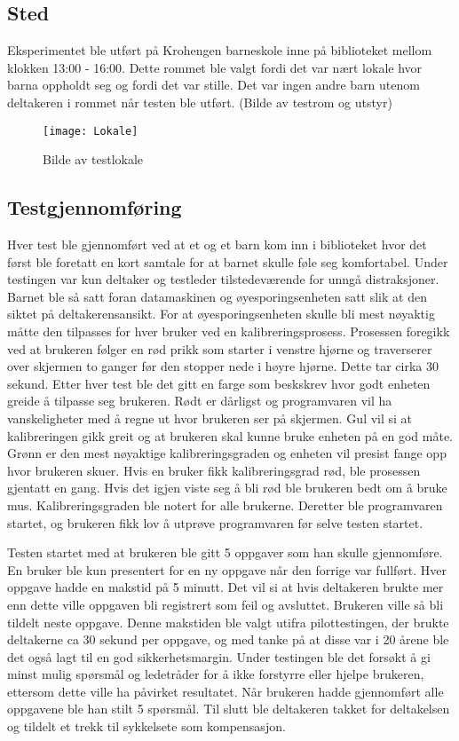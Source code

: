 \subsection{Sted}
Eksperimentet ble utført på Krohengen barneskole inne på biblioteket mellom klokken 13:00 -
16:00. Dette rommet ble valgt fordi det var nært lokale hvor barna oppholdt seg og fordi det var
stille. Det var ingen andre barn utenom deltakeren i rommet når testen ble utført.
(Bilde av testrom og utstyr) 

\begin{figure}[ht!]
\centering
\texttt{[image: Lokale]}
\caption{Bilde av testlokale}
\label{fig:test_lokale}
\end{figure}


\subsection{Testgjennomføring}
Hver test ble gjennomført ved at et og et barn kom inn i biblioteket hvor det først ble foretatt en kort
samtale for at barnet skulle føle seg komfortabel. Under testingen var kun deltaker og testleder
tilstedeværende for unngå distraksjoner. Barnet ble så satt foran datamaskinen og øyesporingsenheten satt slik at den siktet på deltakerensansikt. For at øyesporingsenheten skulle bli mest nøyaktig måtte den tilpasses for hver bruker ved
en kalibreringsprosess. Prosessen foregikk ved at brukeren følger en rød prikk som starter i
venstre hjørne og traverserer over skjermen to ganger før den stopper nede i høyre hjørne. Dette
tar cirka 30 sekund. Etter hver test ble det gitt en farge som beskskrev hvor godt enheten greide å
tilpasse seg brukeren. Rødt er dårligst og programvaren vil ha vanskeligheter med å regne ut hvor
brukeren ser på skjermen. Gul vil si at kalibreringen gikk greit og at brukeren skal kunne bruke
enheten på en god måte. Grønn er den mest nøyaktige kalibreringsgraden og enheten vil presist
fange opp hvor brukeren skuer. Hvis en bruker fikk kalibreringsgrad rød, ble prosessen gjentatt en
gang. Hvis det igjen viste seg å bli rød ble brukeren bedt om å bruke mus. Kalibreringsgraden ble
notert for alle brukerne. Deretter ble programvaren startet, og brukeren fikk lov å utprøve programvaren før selve testen startet.

Testen startet med at brukeren ble  gitt 5 oppgaver som han skulle gjennomføre. En bruker ble kun presentert for en ny oppgave når den forrige var fullført. Hver oppgave hadde en makstid på 5 minutt. Det vil si at hvis deltakeren brukte mer enn dette ville oppgaven bli registrert som feil og avsluttet. Brukeren ville så bli tildelt neste oppgave. Denne makstiden ble valgt utifra pilottestingen, der brukte deltakerne ca 30 sekund per oppgave, og med tanke på at disse var i 20 årene ble det også lagt til en god sikkerhetsmargin. Under testingen ble det forsøkt å gi minst mulig spørsmål og ledetråder for å ikke forstyrre eller hjelpe brukeren, ettersom dette ville ha påvirket resultatet. Når brukeren hadde gjennomført alle oppgavene ble han stilt 5 spørsmål. Til slutt ble deltakeren takket for deltakelsen og tildelt et trekk til sykkelsete som kompensasjon.

